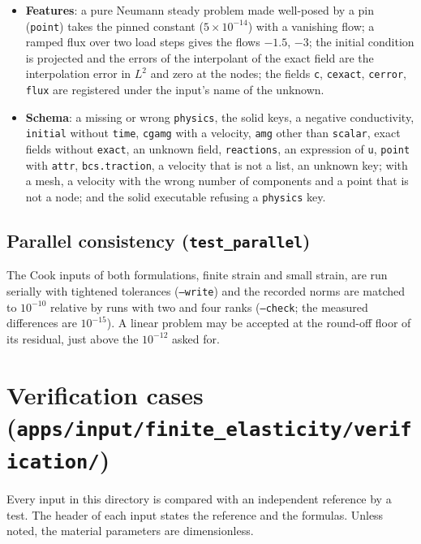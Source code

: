\documentclass[11pt]{article}
\DeclareRobustCommand{\code}[1]{{\def\_{\textunderscore\allowbreak}\texttt{#1}}}
\begin{document}
\begin{itemize}[nosep]
    the linear solve of $\phi$ (capacity $m_0/a_0$, conductivity $1$, the
    same flux) differs from the nonlinear solution by $2.6\times10^{-3}$, below
    the error of either against the series.
  \item \textbf{Features}: a pure Neumann steady problem made well-posed by
    a pin (\code{point}) takes the pinned constant ($5\times10^{-14}$) with a
    vanishing flow; a ramped flux over two load steps gives the flows
    $-1.5$, $-3$; the initial condition is projected and the errors of the
    interpolant of the exact field are the interpolation error in $L^2$ and
    zero at the nodes; the fields \code{c}, \code{c\_exact}, \code{c\_error},
    \code{flux} are registered under the input's name of the unknown.
  \item \textbf{Schema}: a missing or wrong \code{physics}, the solid keys,
    a negative conductivity, \code{initial} without \code{time}, \code{cg\_amg}
    with a velocity, \code{amg} other than \code{scalar}, exact fields without
    \code{exact}, an unknown field, \code{reactions}, an expression of
    \code{u}, \code{point} with \code{attr}, \code{bcs.traction}, a velocity
    that is not a list, an unknown key; with a mesh, a velocity with the
    wrong number of components and a point that is not a node; and the solid
    executable refusing a \code{physics} key.
\end{itemize}

\subsection{Parallel consistency (\texttt{test\_parallel})}
The Cook inputs of both formulations, finite strain and small strain, are
run serially with tightened tolerances (\code{--write}) and the recorded
norms are matched to $10^{-10}$ relative by runs with two and four ranks
(\code{--check}; the measured differences are $10^{-15}$).  A linear
problem may be accepted at the round-off floor of its residual, just above
the $10^{-12}$ asked for.

\section{Verification cases (\texttt{apps/input/finite\_elasticity/verification/})}

Every input in this directory is compared with an independent reference
by a test.  The header of each input states the reference and the
formulas.  Unless noted, the material parameters are dimensionless.
\end{document}
